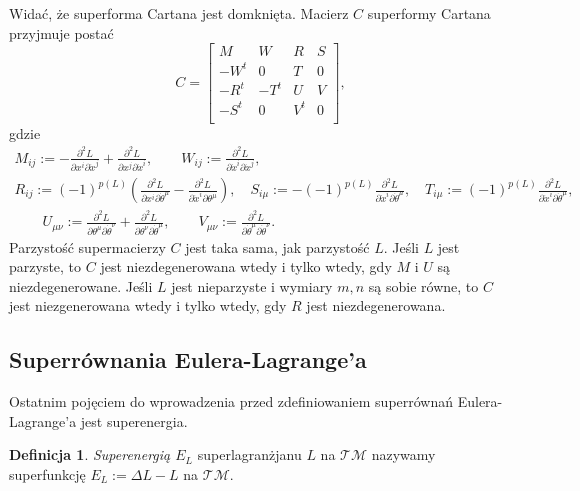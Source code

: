 \documentclass[11pt,a4paper]{report}
\theoremstyle{definition}
\newtheorem{definition}[theorem]{Definicja}
\begin{document}
Widać, że superforma Cartana jest domknięta. Macierz $C$ superformy Cartana przyjmuje postać
\begin{equation*}
	C = \left[\begin{array}{cccc}
		M&W&R&S\\
		-W^t&0&T&0\\
		-R^t&-T^t&U&V\\
		-S^t&0&V^t&0\\
	\end{array}\right]\!,
\end{equation*}
gdzie 
\begin{equation*}
	\begin{gathered}
		M_{ij} :=  - \frac{\partial^2 L}{\partial x^i \partial \dot x^j} + \frac{\partial^2 L}{\partial x^j \partial \dot x^i}, 
		\qquad W_{ij} := \frac{\partial^2 L}{\partial \dot x^i \partial \dot x^j},\\
		R_{ij} := (-1)^{p(L)} \left( \frac{\partial^2 L}{\partial x^i \partial \dot \theta^\mu} - \frac{\partial^2 L}{\partial \dot x^i \partial \theta^\mu} \right)\!,\quad 
		S_{i\mu} := -(-1)^{p(L)} \frac{\partial^2 L}{\partial \dot x^i \partial \dot \theta^\mu},
		\quad T_{i \mu} := (-1)^{p(L)} \frac{\partial^2 L}{\partial \dot x^i \partial \dot \theta^\mu},\\
		\qquad U_{\mu \nu} := \frac{\partial^2 L}{\partial \theta^\mu \partial \dot \theta^\nu}+\frac{\partial^2 L}{\partial \theta^\nu \partial \dot \theta^\mu},
		\qquad V_{\mu \nu} := \frac{\partial^2 L}{\partial \dot \theta^\mu \partial \dot \theta^\nu}.
	\end{gathered}
\end{equation*}
Parzystość supermacierzy $C$ jest taka sama, jak parzystość $L$. Jeśli $L$ jest parzyste, to $C$ jest niezdegenerowana wtedy i tylko wtedy, gdy $M$ i $U$ są niezdegenerowane. Jeśli $L$ jest nieparzyste i wymiary $m,n$ są sobie równe, to $C$ jest niezgenerowana wtedy i tylko wtedy, gdy $R$ jest niezdegenerowana.
			      				
\subsection{Superrównania Eulera-Lagrange'a}
			      				
Ostatnim pojęciem do wprowadzenia przed zdefiniowaniem superrównań Eulera-Lagrange'a jest superenergia.
			      				
\begin{definition}
	\textit{Superenergią $E_L$} superlagranżjanu $L$ na $\mathcal{TM}$ nazywamy superfunkcję $E_L:=\Delta L-L$ na $\mathcal{TM}$.
\end{definition}
			      				
\end{document}
